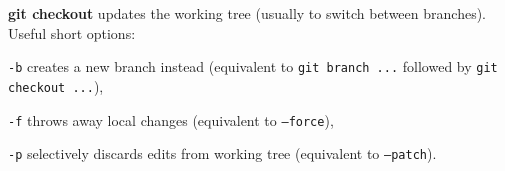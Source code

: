 %

\textbf{git checkout} updates the working tree (usually to switch between branches).
Useful short options:
\begin{compactenum}
\item [\texttt{-b}] creates a new branch instead (equivalent to \texttt{git branch ...} followed by \texttt{git checkout ...}),
\item [\texttt{-f}] throws away local changes (equivalent to \texttt{--force}),
\item [\texttt{-p}] selectively discards edits from working tree (equivalent to \texttt{--patch}).
\end{compactenum}

%